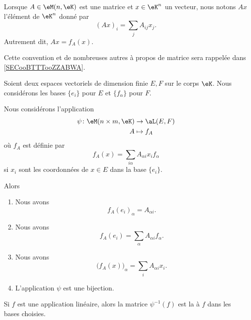 \begin{normaltext}
	Lorsque \( A\in \eM(n,\eK)\) est une matrice et \( x\in \eK^n\) un vecteur, nous notons \( Ax\) l'élément de \( \eK^n\) donné par
	\begin{equation}        \label{EQooQFVTooMFfzol}
		(Ax)_i=\sum_jA_{ij}x_j.
	\end{equation}
	Autrement dit, \( Ax=f_A(x)\).

	Cette convention et de nombreuses autres à propos de matrice sera rappelée dans \ref{SECooBTTTooZZABWA}.
\end{normaltext}

\begin{propositionDef}      \label{PROPooGXDBooHfKRrv}
	Soient deux espaces vectoriels de dimension finie \( E,F\) sur le corps \( \eK\). Nous considérons les bases \( \{ e_i \}\) pour \( E\) et \( \{ f_{\alpha} \}\) pour \( F\).

	Nous considérons l'application
	\begin{equation}
		\begin{aligned}
			\psi\colon \eM(n\times m, \eK) & \to \aL(E,F) \\
			A                              & \mapsto f_A
		\end{aligned}
	\end{equation}
	où \( f_A\) est définie par
	\begin{equation}        \label{EQooZKEKooNYjvhP}
		f_A(x)=\sum_{i\alpha}A_{\alpha i}x_if_{\alpha}
	\end{equation}
	si \( x_i\) sont les coordonnées de \( x\in E\) dans la base \( \{ e_i \}\).

	Alors
	\begin{enumerate}
		\item       \label{ITEMooKZYYooZPTkpq}
		      Nous avons
		      \begin{equation}
			      f_A(e_i)_{\alpha}=A_{\alpha i}.
		      \end{equation}
		\item       \label{ITEMooANXFooGIuxUR}
		      Nous avons
		      \begin{equation}                \label{EQooOKOJooYgteNP}
			      f_A(e_i)=\sum_{\alpha}A_{\alpha i}f_{\alpha}.
		      \end{equation}
		\item       \label{ITEMooXLLLooKfigfB}
		      Nous avons
		      \begin{equation}        \label{EQooAXRJooUwHbjB}
			      \big( f_A(x) \big)_{\alpha}=\sum_{i}A_{\alpha i}x_i.
		      \end{equation}
		\item       \label{ITEMooHSMLooRJZref}
		      L'application \( \psi\) est une bijection.
	\end{enumerate}
	Si \( f\) est une application linéaire, alors la matrice \( \psi^{-1}(f)\) est la  à \( f\) dans les bases choisies.
\end{propositionDef}

